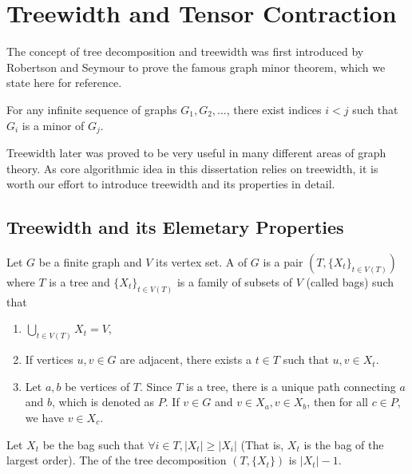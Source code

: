 \chapter{Treewidth and Tensor Contraction} \label{ch:treewidth}

The concept of tree decomposition and treewidth was first introduced by Robertson and Seymour to prove the famous graph minor theorem, which we state here for reference. 

\begin{theorem}
	For any infinite sequence of graphs $G_1, G_2, \ldots$, there exist indices $i < j$ such that $G_i$ is a minor of $G_j$.
\end{theorem}

Treewidth later was proved to be very useful in many different areas of graph theory. 
As core algorithmic idea in this dissertation relies on treewidth, it is worth our effort to introduce treewidth and its properties in detail.

\section{Treewidth and its Elemetary Properties}

\begin{definition}
	Let $G$ be a finite graph and $V$ its vertex set. A  of $G$ is a pair $(T, \{X_t\}_{t \in V(T)})$ where $T$ is a tree and $\{X_t\}_{t \in V(T)}$ is a family of subsets of $V$ (called bags) such that
	\begin{enumerate}
		\item $\bigcup_{t \in V(T)} X_t = V$,
		\item If vertices $u, v \in G$ are adjacent, there exists a $t \in T$  such that $u, v \in X_t$.
		\item Let $a, b$ be vertices of $T$. Since $T$ is a tree, there is a unique path connecting $a$ and $b$, which is denoted as $P$. If $v \in G$ and $v \in X_a, v \in X_b$, then for all $c \in P$, we have $v \in X_c$.
	\end{enumerate}

	Let $X_t$ be the bag such that $ \forall i \in T, |X_t| \geq |X_i|$ (That is, $X_t$ is the bag of the largest order). The  of the tree decomposition $(T, \{X_t\})$ is $|X_t| - 1$.
\end{definition}

